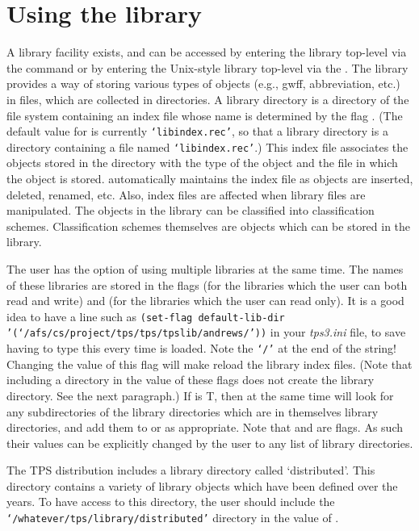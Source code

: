 \chapter{Using the library}\label{library}
A library facility exists, and can be accessed by
entering the library top-level via the  command
or by entering the Unix-style library top-level via the .
The library provides a way of storing various types of objects
(e.g., gwff, abbreviation, etc.) in files, which are collected in directories.
A library directory is a directory of the file system containing an index file whose
name is determined by the flag .
(The default value for  is currently
{\tt `libindex.rec'}, so that a library directory is a directory containing
a file named {\tt `libindex.rec'}.)  This index file associates the objects
stored in the directory with the type of the object and the file in which
the object is stored.
{\TPS} automatically maintains the index file as objects are inserted, deleted, renamed, etc.
Also, index files are affected when library files are manipulated.
The objects in the library can be classified into classification schemes.
Classification schemes themselves are objects which can be stored in the
library.

The user has the option of using multiple libraries at the same time. The names
of these libraries are
stored in the flags  (for the libraries which the user can both read
and write) and  (for the libraries which the user can read only).
It is a good idea to have a line such as
{\tt (set-flag default-lib-dir '(`/afs/cs/project/tps/tps/tpslib/andrews/'))}
in your {\it tps3.ini} file, to save having to type this every time {\TPS} is loaded.
Note the {\tt `/'} at the end of the string!
Changing the value of this flag will make {\TPS} reload the library index files.
(Note that including a directory in the value of these flags does not
create the library directory.  See the next paragraph.)
If 
is T, then at the same time {\TPS} will look for any subdirectories of the library directories which are
in themselves library directories, and add them to  or  as appropriate.
Note that  and 
are flags.  As such their values can be explicitly changed by the user to any list
of library directories.

The TPS distribution includes a library directory called
`distributed'.  This directory contains a variety of library
objects which have been defined over the years.
To have access to this directory, the user should include
the {\tt `/whatever/tps/library/distributed'} directory in the value of
.

